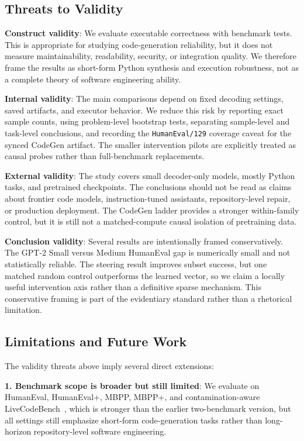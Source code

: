 \documentclass[preprint,12pt,authoryear]{elsarticle}
\begin{document}
\subsection{Threats to Validity}

\textbf{Construct validity}: We evaluate executable correctness with benchmark tests. This is appropriate for studying code-generation reliability, but it does not measure maintainability, readability, security, or integration quality. We therefore frame the results as short-form Python synthesis and execution robustness, not as a complete theory of software engineering ability.

\textbf{Internal validity}: The main comparisons depend on fixed decoding settings, saved artifacts, and executor behavior. We reduce this risk by reporting exact sample counts, using problem-level bootstrap tests, separating sample-level and task-level conclusions, and recording the \texttt{HumanEval/129} coverage caveat for the synced CodeGen artifact. The smaller intervention pilots are explicitly treated as causal probes rather than full-benchmark replacements.

\textbf{External validity}: The study covers small decoder-only models, mostly Python tasks, and pretrained checkpoints. The conclusions should not be read as claims about frontier code models, instruction-tuned assistants, repository-level repair, or production deployment. The CodeGen ladder provides a stronger within-family control, but it is still not a matched-compute causal isolation of pretraining data.

\textbf{Conclusion validity}: Several results are intentionally framed conservatively. The GPT-2 Small versus Medium HumanEval gap is numerically small and not statistically reliable. The steering result improves subset success, but one matched random control outperforms the learned vector, so we claim a locally useful intervention axis rather than a definitive sparse mechanism. This conservative framing is part of the evidentiary standard rather than a rhetorical limitation.

\subsection{Limitations and Future Work}

The validity threats above imply several direct extensions:

\textbf{1. Benchmark scope is broader but still limited}: We evaluate on HumanEval, HumanEval+, MBPP, MBPP+, and contamination-aware LiveCodeBench~\cite{chen2021humaneval,austin2021program,liu2023evalplus,jain2024livecodebench}, which is stronger than the earlier two-benchmark version, but all settings still emphasize short-form code-generation tasks rather than long-horizon repository-level software engineering.
\end{document}
